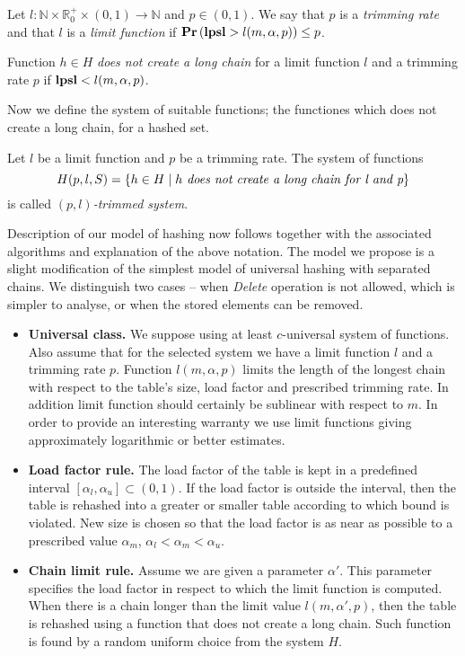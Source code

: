 \begin{definition}
Let $l: \mathbb{N} \times \mathbb{R}_0^+ \times (0, 1) \rightarrow \mathbb{N}$ and $p \in (0, 1)$.  We say that $p$ is a \emph{trimming rate} and that $l$ is a \emph{limit function} if  $\mathbf{Pr}\left(\mathbf{lpsl} > l(m, \alpha, p)\right) \leq p$.

Function $h \in H$ \emph{does not create a long chain} for a limit function $l$ and a trimming rate $p$ if $\mathbf{lpsl} < l(m, \alpha, p)$.
\end{definition}

Now we define the system of suitable functions; the functiones which does not create a long chain, for a hashed set.
\begin{definition}
Let $l$ be a limit function and $p$ be a trimming rate. The system of functions \[ H(p, l, S) = \{ h \in H \mid h \textit{ does not create a long chain for l and p} \} \] is called \emph{$(p, l)$-trimmed system}.
\end{definition}

Description of our model of hashing now follows together with the associated algorithms and explanation of the above notation. The model we propose is a slight modification of the simplest model of universal hashing with separated chains. We distinguish two cases -- when \emph{Delete} operation is not allowed, which is simpler to analyse, or when the stored elements can be removed.

\begin{itemize}
\item \textbf{Universal class.} We suppose using at least $c$-universal system of functions. Also assume that for the selected system we have a limit function $l$ and a trimming rate $p$. Function $l(m, \alpha, p)$ limits the length of the longest chain with respect to the table's size, load factor and prescribed trimming rate. In addition limit function should certainly be sublinear with respect to $m$. In order to provide an interesting warranty we use limit functions giving approximately logarithmic or better estimates.

\item \textbf{Load factor rule.} The load factor of the table is kept in a predefined interval $[\alpha_l, \alpha_u] \subset (0, 1)$. If the load factor is outside the interval, then the table is rehashed into a greater or smaller table according to which bound is violated. New size is chosen so that the load factor is as near as possible to a prescribed value $\alpha_m$, $\alpha_l < \alpha_m < \alpha_u$. 

\item \textbf{Chain limit rule.} Assume we are given a parameter $\alpha'$. This parameter specifies the load factor in respect to which the limit function is computed. When there is a chain longer than the limit value $l(m, \alpha', p)$, then the table is rehashed using a function that does not create a long chain. Such function is found by a random uniform choice from the system $H$.
\end{itemize}

